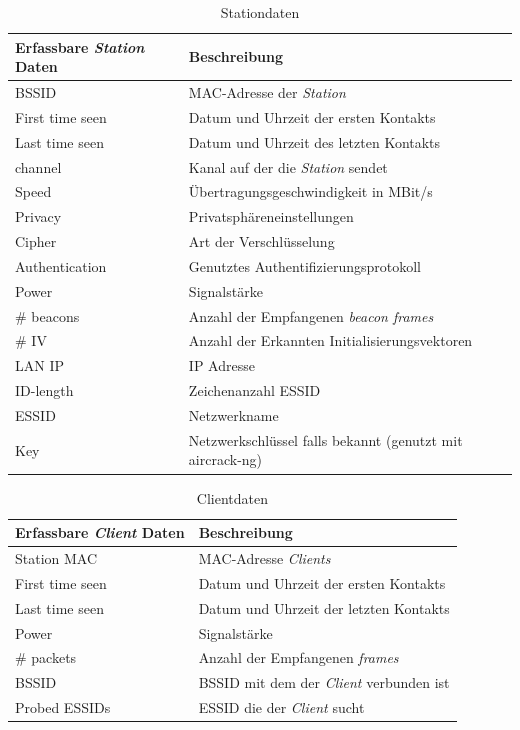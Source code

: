 \documentclass[]{report}
\begin{document}
\begin{center}
\begin{table}
\caption{Stationdaten}\label{tab:1}
  \begin{tabulary}{\textwidth}{l | L}
\toprule
Erfassbare \textit{Station} Daten & Beschreibung \\
\midrule
BSSID & MAC-Adresse der \textit{Station} \\
First time seen & Datum und Uhrzeit der ersten Kontakts \\
Last time seen & Datum und Uhrzeit des letzten Kontakts \\
channel &  Kanal auf der die \textit{Station} sendet \\
Speed & Übertragungsgeschwindigkeit in MBit/s\\
Privacy & Privatsphäreneinstellungen \\
Cipher & Art der Verschlüsselung \\
Authentication & Genutztes Authentifizierungsprotokoll \\
Power & Signalstärke \\ 
\# beacons & Anzahl der Empfangenen \textit{beacon frames}\\
\# IV & Anzahl der Erkannten Initialisierungsvektoren \\
LAN IP &  IP Adresse \\
ID-length & Zeichenanzahl ESSID \\
ESSID & Netzwerkname \\
Key & Netzwerkschlüssel falls bekannt (genutzt mit aircrack-ng) \\
\bottomrule
\end{tabulary}
\end{table}
\end{center} 
\begin{center}
\begin{table}
\caption{Clientdaten}\label{tab:2}
  \begin{tabulary}{\textwidth}{l | L}
\toprule
Erfassbare \textit{Client} Daten & Beschreibung \\
\midrule
Station MAC & MAC-Adresse \textit{Clients} \\
First time seen & Datum und Uhrzeit der ersten Kontakts \\
Last time seen & Datum und Uhrzeit der letzten Kontakts \\
Power & Signalstärke \\
\# packets & Anzahl der Empfangenen \textit{frames} \\
BSSID & BSSID mit dem der \textit{Client} verbunden ist \\
Probed ESSIDs & ESSID die der \textit{Client} sucht \\
\bottomrule
\end{tabulary}
\end{table}
\end{center}
\end{document}
